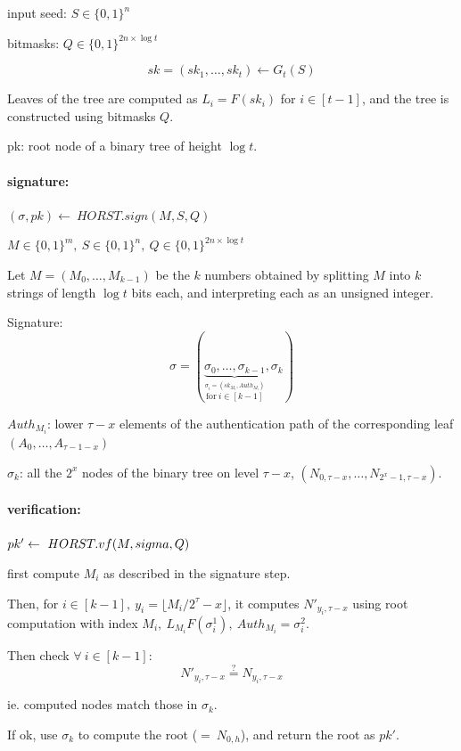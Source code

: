 \documentclass{article}
\theoremstyle{definition}
\begin{document}
input seed: $S \in \{0,1\}^n$

bitmasks: $Q \in \{0,1\}^{2n \times \log t}$

$$sk=(sk_1, \ldots, sk_t) \leftarrow G_t(S)$$

Leaves of the tree are computed as $L_i=F(sk_i)$ for $i \in [t-1]$, and the tree is constructed using bitmasks $Q$.

pk: root node of a binary tree of height $\log t$.


\paragraph{signature:} $(\sigma, pk) \leftarrow~ HORST.sign(M, S, Q)$

$M \in \{0,1\}^m,~ S \in \{0,1\}^n,~ Q \in \{0,1\}^{2n \times \log t}$

Let $M=(M_0, \ldots, M_{k-1})$ be the $k$ numbers obtained by splitting $M$ into $k$ strings of length $\log t$ bits each, and interpreting each as an unsigned integer.

Signature:
$$\sigma = (\underbrace{\sigma_0, \ldots, \sigma_{k-1}}_{\stackrel{\sigma_i=(sk_{M_i}, Auth_{M_i})}{\text{for}~ i\in [k-1]}}, \sigma_k)$$

$Auth_{M_i}$: lower $\tau - x$ elements of the authentication path of the corresponding leaf $(A_0, \ldots, A_{\tau-1-x})$

$\sigma_k$: all the $2^x$ nodes of the binary tree on level $\tau-x$, $(N_{0,\tau-x}, \ldots, N_{2^x -1, \tau-x})$.

\paragraph{verification:} $pk' \leftarrow~ HORST.vf(M, \\sigma, Q)$

first compute $M_i$ as described in the signature step.

Then, for $i \in [k-1], ~ y_i = \lfloor M_i / 2^{\tau}-x \rfloor$, it computes $N'_{y_i, \tau-x}$ using root computation with index $M_i,~ L_{M_i}F(\sigma_i^1),~ Auth_{M_i}=\sigma_i^2$.

Then check $\forall~ i \in [k-1]$:
$$N'_{y_i, \tau-x} \stackrel{?}{=} N_{y_i, \tau-x}$$

ie. computed nodes match those in $\sigma_k$.

If ok, use $\sigma_k$ to compute the root ($= ~ N_{0, h}$), and return the root as $pk'$.
\end{document}
